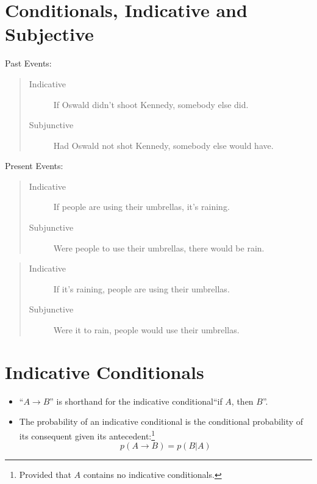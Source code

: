 \documentclass[12pt]{extarticle}
\begin{document}
\section{Conditionals, Indicative and Subjective}

Past Events:
\begin{quote}
\begin{description}
\item[Indicative] If Oswald didn't shoot Kennedy, somebody else did.
\item[Subjunctive] Had Oswald not shot Kennedy, somebody else would have.
\end{description}

\end{quote}
Present Events:
\begin{quote}
\begin{description}
\item[Indicative] If people are using their umbrellas, it's raining.
\item[Subjunctive] Were people to use their umbrellas, there would be rain.


\end{description}
\end{quote}



\begin{quote}
\begin{description}
\item[Indicative] If it's raining, people are using their umbrellas.

\item[Subjunctive] Were it to rain, people would use their umbrellas.

\end{description}
\end{quote}


\section{Indicative Conditionals}

\begin{itemize}
\item ``$A \rightarrow B$'' is shorthand for the indicative conditional``if $A$, then $B$''.


\item The probability of an indicative conditional is the conditional probability of its consequent given its antecedent:\footnote{Provided that $A$ contains no indicative conditionals.}
$$p(A \rightarrow B) = p(B|A)$$

\end{itemize}
\end{document}
